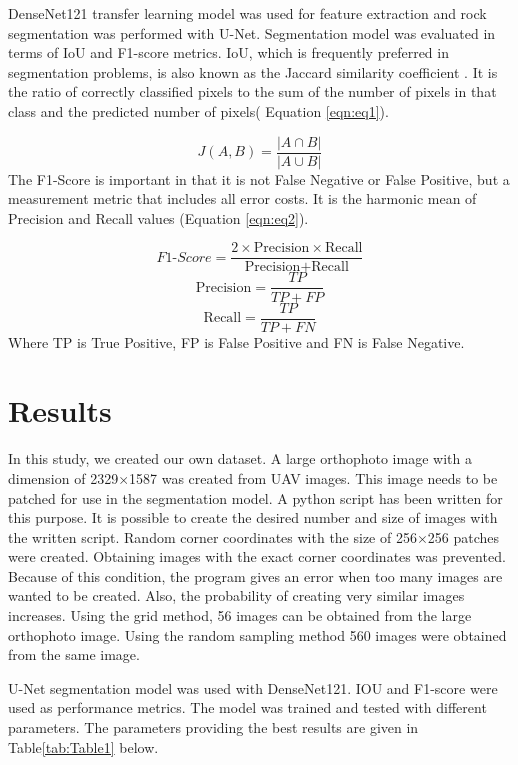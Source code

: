 \documentclass[a4paper,fleqn]{cas-sc}
\begin{document}
DenseNet121 transfer learning model was used for feature extraction and rock segmentation was performed with U-Net. Segmentation model was evaluated in terms of IoU and F1-score metrics. IoU, which is frequently preferred in segmentation problems, is also known as the Jaccard similarity coefficient \citep{jaccard1912distribution}. It is the ratio of correctly classified pixels to the sum of the number of pixels in that class and the predicted number of pixels( Equation \ref{eqn:eq1}). 

\begin{equation}
\label{eqn:eq1}
    J(A,B) = \frac{|A \cap B|}{|A \cup B|}
\end{equation}
The F1-Score is important in that it is not False Negative or False Positive, but a measurement metric that includes all error costs. It is the harmonic mean of Precision and Recall values (Equation \ref{eqn:eq2}).

\begin{equation}
\label{eqn:eq2}
F1\text{-}Score = \frac{2 \times \text{Precision} \times \text{Recall}}{\text{Precision} + \text{Recall}}
\end{equation}
\[
\text{Precision} = \frac{TP}{TP + FP}
\]
\[
\text{Recall} = \frac{TP}{TP + FN}
\]
Where TP is True Positive, FP is False Positive and FN is False Negative.


\section{Results}
In this study, we created our own dataset. A large orthophoto image with a dimension of 2329$\times$1587 was created from UAV images. This image needs to be patched for use in the segmentation model. A python script has been written for this purpose. It is possible to create the desired number and size of images with the written script. Random corner coordinates with the size of 256$\times$256 patches were created. Obtaining images with the exact corner coordinates was prevented. Because of this condition, the program gives an error when too many images are wanted to be created. Also, the probability of creating very similar images increases. Using the grid method, 56 images can be obtained from the large orthophoto image. Using the random sampling method 560 images were obtained from the same image.

U-Net segmentation model was used with DenseNet121. IOU and F1-score were used as performance metrics. The model was trained and tested with different parameters. The parameters providing the best results are given in Table\ref{tab:Table1} below.
\end{document}
